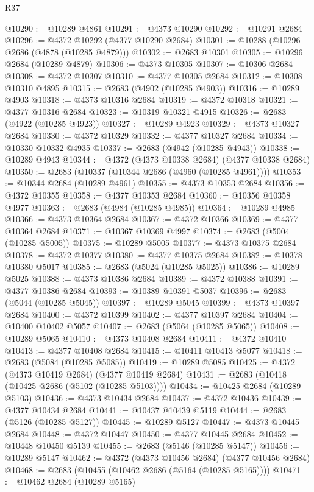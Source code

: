 \begin{lexlean}{R37}
\begin{coremodule}
@10290 := @10289 @4861
@10291 := @4373 @10290
@10292 := @10291 @2684
@10296 := @4372 @10292 (@4377 @10290 @2684)
@10301 := @10288 (@10296 @2686 (@4878 (@10285 @4879)))
@10302 := @2683 @10301
@10305 := @10296 @2684 (@10289 @4879)
@10306 := @4373 @10305
@10307 := @10306 @2684
@10308 := @4372 @10307
@10310 := @4377 @10305 @2684
@10312 := @10308 @10310 @4895
@10315 := @2683 (@4902 (@10285 @4903))
@10316 := @10289 @4903
@10318 := @4373 @10316 @2684
@10319 := @4372 @10318
@10321 := @4377 @10316 @2684
@10323 := @10319 @10321 @4915
@10326 := @2683 (@4922 (@10285 @4923))
@10327 := @10289 @4923
@10329 := @4373 @10327 @2684
@10330 := @4372 @10329
@10332 := @4377 @10327 @2684
@10334 := @10330 @10332 @4935
@10337 := @2683 (@4942 (@10285 @4943))
@10338 := @10289 @4943
@10344 := @4372 (@4373 @10338 @2684) (@4377 @10338 @2684)
@10350 := @2683 (@10337 (@10344 @2686 (@4960 (@10285 @4961))))
@10353 := @10344 @2684 (@10289 @4961)
@10355 := @4373 @10353 @2684
@10356 := @4372 @10355
@10358 := @4377 @10353 @2684
@10360 := @10356 @10358 @4977
@10363 := @2683 (@4984 (@10285 @4985))
@10364 := @10289 @4985
@10366 := @4373 @10364 @2684
@10367 := @4372 @10366
@10369 := @4377 @10364 @2684
@10371 := @10367 @10369 @4997
@10374 := @2683 (@5004 (@10285 @5005))
@10375 := @10289 @5005
@10377 := @4373 @10375 @2684
@10378 := @4372 @10377
@10380 := @4377 @10375 @2684
@10382 := @10378 @10380 @5017
@10385 := @2683 (@5024 (@10285 @5025))
@10386 := @10289 @5025
@10388 := @4373 @10386 @2684
@10389 := @4372 @10388
@10391 := @4377 @10386 @2684
@10393 := @10389 @10391 @5037
@10396 := @2683 (@5044 (@10285 @5045))
@10397 := @10289 @5045
@10399 := @4373 @10397 @2684
@10400 := @4372 @10399
@10402 := @4377 @10397 @2684
@10404 := @10400 @10402 @5057
@10407 := @2683 (@5064 (@10285 @5065))
@10408 := @10289 @5065
@10410 := @4373 @10408 @2684
@10411 := @4372 @10410
@10413 := @4377 @10408 @2684
@10415 := @10411 @10413 @5077
@10418 := @2683 (@5084 (@10285 @5085))
@10419 := @10289 @5085
@10425 := @4372 (@4373 @10419 @2684) (@4377 @10419 @2684)
@10431 := @2683 (@10418 (@10425 @2686 (@5102 (@10285 @5103))))
@10434 := @10425 @2684 (@10289 @5103)
@10436 := @4373 @10434 @2684
@10437 := @4372 @10436
@10439 := @4377 @10434 @2684
@10441 := @10437 @10439 @5119
@10444 := @2683 (@5126 (@10285 @5127))
@10445 := @10289 @5127
@10447 := @4373 @10445 @2684
@10448 := @4372 @10447
@10450 := @4377 @10445 @2684
@10452 := @10448 @10450 @5139
@10455 := @2683 (@5146 (@10285 @5147))
@10456 := @10289 @5147
@10462 := @4372 (@4373 @10456 @2684) (@4377 @10456 @2684)
@10468 := @2683 (@10455 (@10462 @2686 (@5164 (@10285 @5165))))
@10471 := @10462 @2684 (@10289 @5165)

\end{coremodule}
\end{lexlean}
